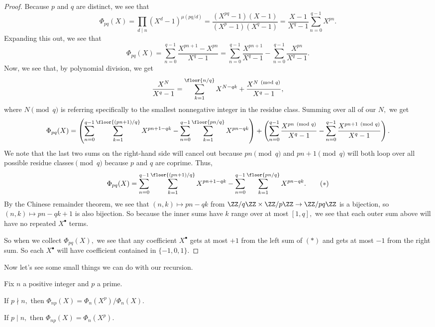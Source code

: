 \documentclass[../notes.tex]{subfiles}
\begin{document}
\begin{proof}
	Because $p$ and $q$ are distinct, we see that
	\[\Phi_{pq}(X)=\prod_{d\mid n}\left(X^d-1\right)^{\mu(pq/d)}=\frac{\left(X^{pq}-1\right)(X-1)}{\left(X^p-1\right)\left(X^q-1\right)}=\frac{X-1}{X^q-1}\sum_{n=0}^{q-1}X^{pn}.\]
	Expanding this out, we see that
	\[\Phi_{pq}(X)=\sum_{n=0}^{q-1}\frac{X^{pn+1}-X^{pn}}{X^q-1}=\sum_{n=0}^{q-1}\frac{X^{pn+1}}{X^q-1}-\sum_{n=0}^{q-1}\frac{X^{pn}}{X^q-1}.\]
	Now, we see that, by polynomial division, we get
	\[\frac{X^N}{X^q-1}=\sum_{k=1}^{\floor{n/q}}X^{N-qk}+\frac{X^{N\pmod q}}{X^q-1},\]
	where $N\pmod q$ is referring specifically to the smallest nonnegative integer in the residue class. Summing over all of our $N,$ we get
	\[\Phi_{pq}(X)=\left(\sum_{n=0}^{q-1}\sum_{k=1}^{\floor{(pn+1)/q}}X^{pn+1-qk}-\sum_{n=0}^{q-1}\sum_{k=1}^{\floor{pn/q}}X^{pn-qk}\right)+\left(\sum_{n=0}^{q-1}\frac{X^{pn\pmod q}}{X^q-1}-\sum_{n=0}^{q-1}\frac{X^{pn+1\pmod q}}{X^q-1}\right).\]
	We note that the last two sums on the right-hand side will cancel out because $pn\pmod q$ and $pn+1\pmod q$ will both loop over all possible residue classes$\pmod q$ because $p$ and $q$ are coprime. Thus,
	\[\Phi_{pq}(X)=\sum_{n=0}^{q-1}\sum_{k=1}^{\floor{(pn+1)/q}}X^{pn+1-qk}-\sum_{n=0}^{q-1}\sum_{k=1}^{\floor{pn/q}}X^{pn-qk}.\tag{$*$}\]
	By the Chinese remainder theorem, we see that $(n,k)\mapsto pn-qk$ from $\ZZ/q\ZZ\times\ZZ/p\ZZ\to\ZZ/pq\ZZ$ is a bijection, so $(n,k)\mapsto pn-qk+1$ is also bijection. So because the inner sums have $k$ range over at most $[1,q],$ we see that each outer sum above will have no repeated $X^\bullet$ terms.

	So when we collect $\Phi_{pq}(X),$ we see that any coefficient $X^\bullet$ gets at most $+1$ from the left sum of $(*)$ and gets at most $-1$ from the right sum. So each $X^\bullet$ will have coefficient contained in $\{-1,0,1\}.$
\end{proof}
Now let's see some small things we can do with our recursion.
\begin{lemma} \label{lem:cyclocompute}
	Fix $n$ a positive integer and $p$ a prime.
	\begin{listalph}
		\item If $p\nmid n,$ then $\Phi_{np}(X)=\Phi_n\left(X^p\right)/\Phi_n(X).$
		\item If $p\mid n,$ then $\Phi_{np}(X)=\Phi_n\left(X^p\right).$
	\end{listalph}
\end{lemma}
\end{document}
